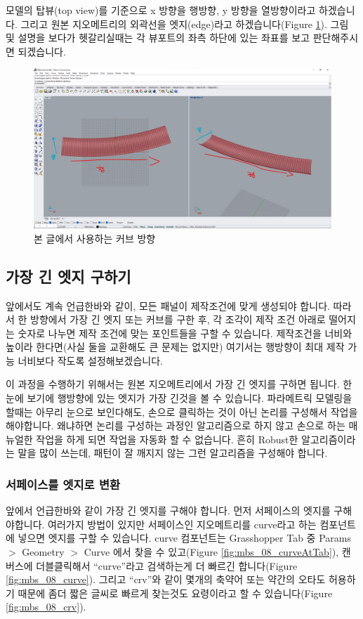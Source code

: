 \documentclass[11pt]{article}
\begin{document}
모델의 탑뷰(top view)를 기준으로 x 방향을 행방향, y 방향을 열방향이라고 하겠습니다. 그리고 원본 지오메트리의 외곽선을 엣지(edge)라고 하겠습니다(Figure \ref{fig:mbs_07_lang}). 그림 및 설명을 보다가 헷갈리실때는 각 뷰포트의 좌측 하단에 있는 좌표를 보고 판단해주시면 되겠습니다.
\begin{figure}[H]
    \includegraphics[width=\textwidth]{./img/mbs_07_lang.png}
    \caption{본 글에서 사용하는 커브 방향}
    \label{fig:mbs_07_lang}
\end{figure}
\pagebreak


\subsection{가장 긴 엣지 구하기}
앞에서도 계속 언급한바와 같이, 모든 패널이 제작조건에 맞게 생성되야 합니다. 따라서 한 방향에서 가장 긴 엣지 또는 커브를 구한 후, 각 조각이 제작 조건 아래로 떨어지는 숫자로 나누면 제작 조건에 맞는 포인트들을 구할 수 있습니다.
 제작조건을 너비와 높이라 한다면(사실 둘을 교환해도 큰 문제는 없지만) 여기서는 행방향이 최대 제작 가능 너비보다 작도록 설정해보겠습니다. 

이 과정을 수행하기 위해서는 원본 지오메트리에서 가장 긴 엣지를 구하면 됩니다. 한눈에 보기에 행방향에 있는 엣지가 가장 긴것을 볼 수 있습니다. 파라메트릭 모델링을 할때는 아무리 눈으로 보인다해도, 손으로 클릭하는 것이 아닌 논리를 구성해서 작업을 해야합니다.
 왜냐하면 논리를 구성하는 과정인 알고리즘으로 하지 않고 손으로 하는 매뉴얼한 작업을 하게 되면 작업을 자동화 할 수 없습니다. 흔히 Robust한 알고리즘이라는 말을 많이 쓰는데, 패턴이 잘 깨지지 않는 그런 알고리즘을 구성해야 합니다.

\subsubsection{서페이스를 엣지로 변환}
앞에서 언급한바와 같이 가장 긴 엣지를 구해야 합니다. 먼저 서페이스의 엣지를 구해야합니다. 여러가지 방법이 있지만 서페이스인 지오메트리를 curve라고 하는 컴포넌트에 넣으면 엣지를 구할 수 있습니다. 
curve 컴포넌트는 Grasshopper Tab 중 Params $>$ Geometry $>$ Curve 에서 찾을 수 있고(Figure \ref{fig:mbs_08_curveAtTab}), 캔버스에 더블클릭해서 ``curve''라고 검색하는게 더 빠르긴 합니다(Figure \ref{fig:mbs_08_curve}).
그리고 ``crv''와 같이 몇개의 축약어 또는 약간의 오타도 허용하기 때문에 좀더 짧은 글씨로 빠르게 찾는것도 요령이라고 할 수 있습니다(Figure \ref{fig:mbs_08_crv}).
\end{document}
